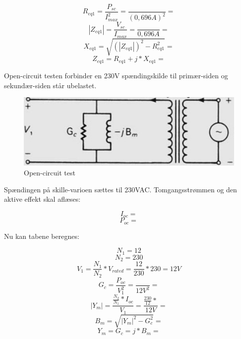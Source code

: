\begin{equation}
	R_{eq1} = \frac{P_{sc}}{I_{max}^2} = \frac{}{(0,696A)^2} = 
\end{equation}
\begin{equation}
	\left|Z_{eq1}\right| = \frac{V_{sc}}{I_{max}} = \frac{}{0,696A} = 
\end{equation}
\begin{equation}
	X_{eq1} = \sqrt{\left(\left|Z_{eq1}\right|\right)^2 - R_{eq1}^2} = 
\end{equation}
\begin{equation}
	Z_{eq1} = R_{eq1} + j * X_{eq1} = 
\end{equation}

Open-circuit testen forbinder en 230V spændingskilde til primær-siden og sekundær-siden står ubelastet.

\begin{figure}[H]
	\centering
	\includegraphics[scale=0.25]{../Hardware/PSU/Transformer/OpenCircuit}
	\caption{Open-circuit test}
	\label{photo:OpenCircuit}
\end{figure}


Spændingen på skille-varioen sættes til 230VAC. Tomgangsstrømmen og den aktive effekt skal aflæses:

\begin{equation}
	I_{oc} = 
\end{equation}
\begin{equation}
	P_{oc} = 
\end{equation}

Nu kan tabene beregnes:

\begin{equation}
	N_1 = 12
\end{equation}
\begin{equation}
	N_2 = 230
\end{equation}
\begin{equation}
	V_1 = \frac{N_1}{N_2} * V_{rated} = \frac{12}{230} * 230 = 12V
\end{equation}
\begin{equation}
	G_c = \frac{P_{oc}}{V_1^2} = \frac{}{12V^2} = 
\end{equation}
\begin{equation}
	\left|Y_m\right| = \frac{\frac{N_2}{N_1} * I_{oc}}{V_1} = \frac{\frac{230}{12} * }{12V} = 
\end{equation}
\begin{equation}
	B_m = \sqrt{\left|Y_m\right|^2 - G_c^2} = 
\end{equation}
\begin{equation}
	Y_m = G_c = j * B_m = 
\end{equation}



